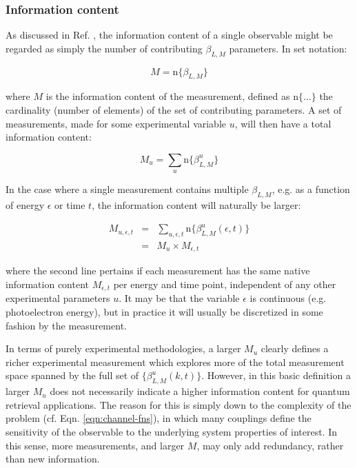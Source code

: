 \documentclass[10pt]{article}
\begin{document}
\subsubsection{Information content\label{sec:info-content}}

As discussed in Ref. \cite{hockett2018QMP2}, the information content of a single observable might be regarded as simply the number of contributing $\beta_{L,M}$ parameters. In set notation:

\begin{equation}
M=\mathrm{n}\{\beta_{L,M}\}
\end{equation}

where $M$ is the information content of the measurement, defined
as $\mathrm{n}\{...\}$ the cardinality (number of elements) of the
set of contributing parameters. A set of measurements, made for some
experimental variable $u$, will then have a total information content:

\begin{equation}
M_{u}=\sum_{u}\mathrm{n}\{\beta_{L,M}^{u}\}
\end{equation}

In the case where a single measurement contains multiple $\beta_{L,M}$, e.g. as a function of energy $\epsilon$ or time $t$, the information content will naturally be larger:

\begin{eqnarray}
M_{u,\epsilon,t} & = & \sum_{u,\epsilon,t}\mathrm{n}\{\beta_{L,M}^{u}(\epsilon,t)\}\\
 & = & M_{u}\times M_{\epsilon,t}
\end{eqnarray}

where the second line pertains if each measurement has the same native
information content $M_{\epsilon,t}$ per energy and time point, independent of any other experimental parameters $u$. It may be that the variable
$\epsilon$ is continuous (e.g. photoelectron energy), but in practice it
will usually be discretized in some fashion by the measurement.

In terms of purely experimental methodologies, a larger $M_{u}$ clearly defines a richer experimental measurement which explores more of the total measurement space spanned by the full set of $\{\beta_{L,M}^{u}(k,t)\}$. However, in this basic definition a larger $M_{u}$ does not necessarily indicate a higher information content for quantum retrieval applications.
The reason for this is simply down to the complexity of the problem
(cf. Eqn. \ref{eqn:channel-fns}), in which many couplings define
the sensitivity of the observable to the underlying system properties
of interest. In this sense, more measurements, and larger $M$, may
only add redundancy, rather than new information.
\end{document}
